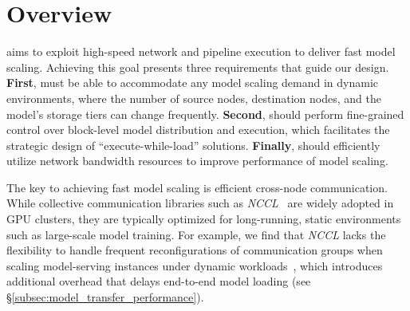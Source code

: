 \section{\SysName Overview}
\label{sec:overview}

\SysName aims to exploit high-speed network and pipeline execution to deliver fast model scaling. 
Achieving this goal presents three requirements that guide our design.
\textbf{First}, \SysName must be able to accommodate any model scaling demand in dynamic environments, where the number of source nodes, destination nodes, and the model's storage tiers can change frequently.
\textbf{Second}, \SysName should perform fine-grained control over block-level model distribution and execution, which facilitates the strategic design of ``execute-while-load'' solutions.
\textbf{Finally}, \SysName should efficiently utilize network bandwidth resources to improve performance of model scaling.

 \fi
 
The key to achieving fast model scaling is efficient cross-node communication.
While collective communication libraries such as {\it NCCL}~\cite{nccl} are widely adopted in GPU clusters, they are typically optimized for long-running, static environments such as large-scale model training. 
For example, we find that {\it NCCL} lacks the flexibility to handle frequent reconfigurations of communication groups when scaling model-serving instances under dynamic workloads~\cite{nccl_cold_start_issue}, which introduces additional overhead that delays end-to-end model loading (see \S\ref{subsec:model_transfer_performance}).

